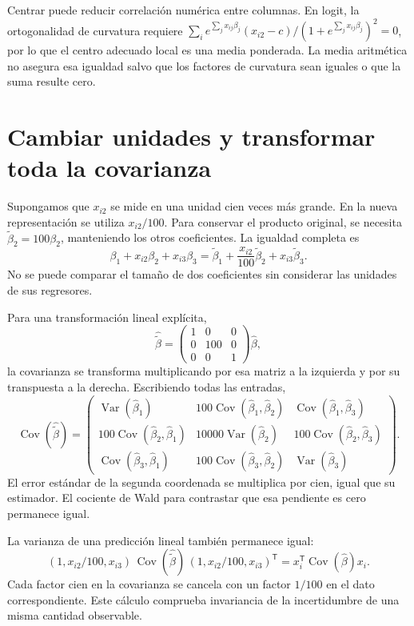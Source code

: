 \documentclass[11pt,a4paper]{article}
\newcommand{\T}{^{\mathsf T}}
\DeclareMathOperator{\Var}{Var}
\DeclareMathOperator{\Cov}{Cov}
\begin{document}
Centrar puede reducir correlación numérica entre columnas.
En logit, la ortogonalidad de curvatura requiere
\(\sum_i e^{\sum_jx_{ij}\beta_j}
(x_{i2}-c)/(1+e^{\sum_jx_{ij}\beta_j})^2=0\),
por lo que el centro adecuado local es una media ponderada.
La media aritmética no asegura esa igualdad salvo que
los factores de curvatura sean iguales o que la suma resulte cero.

\clearpage
\section{Cambiar unidades y transformar toda la covarianza}\label{logit74}
Supongamos que \(x_{i2}\) se mide en una unidad cien veces
más grande. En la nueva representación se utiliza \(x_{i2}/100\).
Para conservar el producto original, se necesita
\(\widetilde\beta_2=100\beta_2\), manteniendo los otros coeficientes.
La igualdad completa es
\[
\beta_1+x_{i2}\beta_2+x_{i3}\beta_3
=\widetilde\beta_1+\frac{x_{i2}}{100}\widetilde\beta_2
+x_{i3}\widetilde\beta_3.
\]
No se puede comparar el tamaño de dos coeficientes
sin considerar las unidades de sus regresores.

Para una transformación lineal explícita,
\[
\widehat{\widetilde\beta}=
\begin{pmatrix}1&0&0\\0&100&0\\0&0&1\end{pmatrix}
\widehat\beta,
\]
la covarianza se transforma multiplicando por esa matriz
a la izquierda y por su transpuesta a la derecha.
Escribiendo todas las entradas,
\[
\Cov(\widehat{\widetilde\beta})=
\begin{pmatrix}
\Var(\widehat\beta_1)&100\Cov(\widehat\beta_1,\widehat\beta_2)&\Cov(\widehat\beta_1,\widehat\beta_3)\\
100\Cov(\widehat\beta_2,\widehat\beta_1)&10000\Var(\widehat\beta_2)&100\Cov(\widehat\beta_2,\widehat\beta_3)\\
\Cov(\widehat\beta_3,\widehat\beta_1)&100\Cov(\widehat\beta_3,\widehat\beta_2)&\Var(\widehat\beta_3)
\end{pmatrix}.
\]
El error estándar de la segunda coordenada se multiplica
por cien, igual que su estimador. El cociente de Wald
para contrastar que esa pendiente es cero permanece igual.

La varianza de una predicción lineal también permanece igual:
\[
(1,x_{i2}/100,x_{i3})
\,\Cov(\widehat{\widetilde\beta})\,
(1,x_{i2}/100,x_{i3})\T
=x_i\T\Cov(\widehat\beta)x_i.
\]
Cada factor cien en la covarianza se cancela con un factor
\(1/100\) en el dato correspondiente.
Este cálculo comprueba invariancia de la incertidumbre
de una misma cantidad observable.
\end{document}
